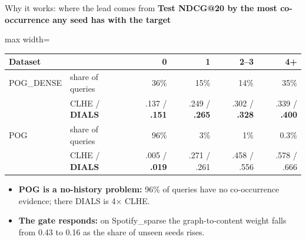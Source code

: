 \documentclass[10pt,aspectratio=169]{beamer}
\newcommand{\key}[1]{\textcolor{Accent}{\textbf{#1}}}
\begin{document}
\begin{frame}{Why it works: where the lead comes from}
\textbf{Test NDCG@20 by the most co-occurrence any seed has with the target}\par\vspace{2mm}
\centering\renewcommand{\arraystretch}{1.3}
\begin{adjustbox}{max width=\textwidth}\begin{tabular}{llrrrr}\toprule
Dataset & & 0 & 1 & 2--3 & 4+\\\midrule
POG\_DENSE & share of queries & 36\% & 15\% & 14\% & 35\%\\
& CLHE / \key{DIALS} & .137 / \textbf{.151} & .249 / \textbf{.265} & .302 / \textbf{.328} & .339 / \textbf{.400}\\
POG & share of queries & 96\% & 3\% & 1\% & 0.3\%\\
& CLHE / \key{DIALS} & .005 / \textbf{.019} & .271 / .261 & .458 / .556 & .578 / .666\\\bottomrule
\end{tabular}\end{adjustbox}\par
\raggedright\vspace{4mm}
\begin{itemize}\setlength\itemsep{4pt}
\item \key{POG is a no-history problem:} 96\% of queries have no co-occurrence evidence; there DIALS is 4$\times$ CLHE.
\item \key{The gate responds:} on Spotify\_sparse the graph-to-content weight falls from 0.43 to 0.16 as the share of unseen seeds rises.
\end{itemize}
\end{frame}
\end{document}

